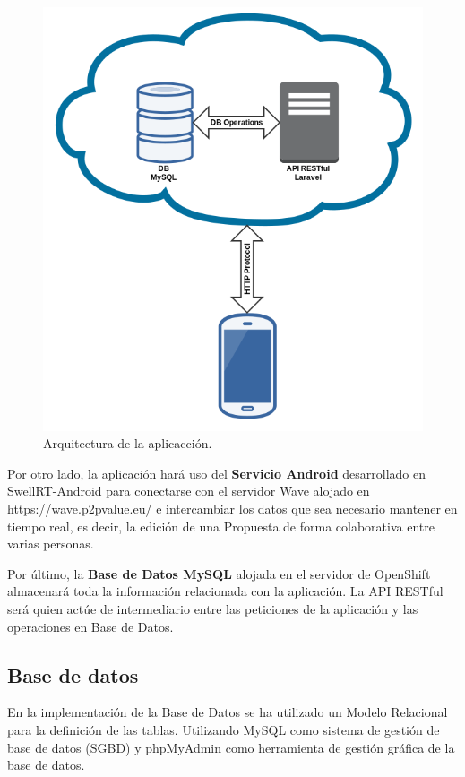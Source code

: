 \begin{figure}[H]
\centering
\includegraphics[keepaspectratio, scale=0.4]{Media/Captures/architecture.png}
\caption{Arquitectura de la aplicacción.}
\label{fig:architecture}
\end{figure}

Por otro lado, la aplicación hará uso del \textbf{Servicio Android} desarrollado en SwellRT-Android \cite{ref:swellRT_android_github} para conectarse con el servidor Wave alojado en https://wave.p2pvalue.eu/ e intercambiar los datos que sea necesario mantener en tiempo real, es decir, la edición de una Propuesta de forma colaborativa entre varias personas.

Por último, la \textbf{Base de Datos MySQL} alojada en el servidor de OpenShift almacenará toda la información relacionada con la aplicación. La API RESTful será quien actúe de intermediario entre las peticiones de la aplicación y las operaciones en Base de Datos.

\subsection{Base de datos}

En la implementación de la Base de Datos se ha utilizado un Modelo Relacional para la definición de las tablas. Utilizando MySQL \cite{ref:mysql} como sistema de gestión de base de datos (SGBD) y phpMyAdmin \cite{ref:phpMyAdmin} como herramienta de gestión gráfica de la base de datos.

